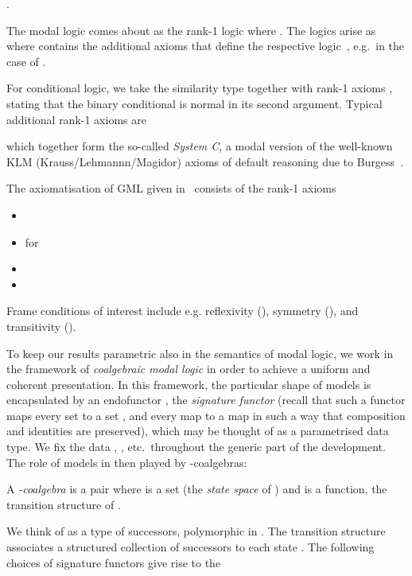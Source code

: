 \documentclass[proceedings]{stacs}
\theoremstyle{definition}
\theoremstyle{plain}
\newcounter{blubber}
\newenvironment{sparenumerate}
{\begin{list}
  {\arabic{blubber}.}
  {\usecounter{blubber}
   \setlength{\leftmargin}{0pt}
    \setlength{\parsep}{0pt}
    \setlength{\itemindent}{3ex}
    \setlength{\itemsep}{2pt}   
    \setlength{\listparindent}{3ex}
  }
}
{\end{list}}
\begin{document}
\begin{exas}\label{expl:axioms}
\begin{sparenumerate}
\item \label{item:ax-kripke} The modal logic  comes about as the
  rank-1 logic  where . The logics
   arise as  where
   contains the additional axioms that define the respective
  logic~\cite{BlackburnEA01}, e.g.\ 
  in the case of .
\item\label{item:ax-cond} For conditional logic, we take the
  similarity type  together with rank-1 axioms ,  stating that
  the binary conditional is normal in its second argument. Typical
  additional rank-1 axioms are
  
  which together form the so-called \emph{System C}, a modal version of the
  well-known KLM (Krauss/Lehmannn/Magidor) axioms of default reasoning
  due to Burgess~\cite{Burgess81}.
\item\label{item:ax-gml} The axiomatisation of GML
  given in~\cite{Fine72} consists of the rank-1 axioms
\begin{itemize}
\item[] 
\item[]  for 
\item[] 
\item[] 
\end{itemize}
Frame conditions of interest include e.g. reflexivity (), symmetry (), and transitivity
().
\end{sparenumerate}
\end{exas}
\noindent To keep our results parametric also in the semantics of
modal logic, we work in the framework of \emph{coalgebraic modal
  logic} in order to achieve a uniform and coherent presentation.  In
this framework, the particular shape of models is encapsulated by an
endofunctor , the \emph{signature functor} (recall
that such a functor maps every set  to a set , and every map
 to a map  in such a way that composition and
identities are preserved), which may be thought of as a parametrised
data type. We fix the data , ,  etc.\ throughout
the generic part of the development. The role of models in then played
by -coalgebras:
\begin{defi}
A \emph{-coalgebra} is a pair  where  is a set
(the \emph{state space} of )
and  is a
function, the transition structure of .
\end{defi}
\noindent We think of  as a type of successors,
polymorphic in . The
transition structure 
associates a structured collection of successors 
 to each state .
\noindent The following choices of signature functors give rise to the
\end{document}
